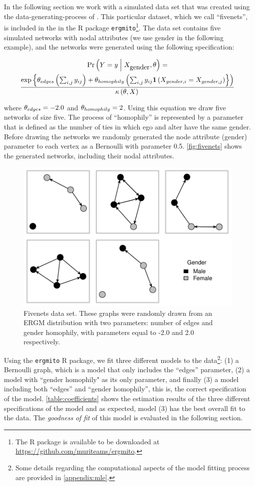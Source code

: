 \documentclass[12pt]{article}
\begin{document}
In the following section we work with a simulated data set that was created using the data-generating-process of \ergmitos{}. This particular dataset, which we call ``fivenets'', is included in the in the R package \texttt{ergmito}\footnote{The R package is available to be downloaded at  \url{https://github.com/muriteams/ergmito}.}. The data set contains five simulated networks with nodal attributes (we use gender in the following example), and the networks were generated using the following specification:

\begin{multline*}
\Prcond{\Adjmat = \adjmat}{\Indepvar_{\mbox{gender}}, \params} = \\
\frac{ %
    \exp{\params_{edges}\left(\sum_{i,j} \adjmat_{ij}\right) + %
    \params_{homophily}\left(\sum_{i,j} \adjmat_{ij}\isone{\Indepvar_{gender, i} = \Indepvar_{gender, j}}}\right) %
    }{%
    \normconst{}
    }
\end{multline*}

\noindent where $\theta_{edges} = -2.0$ and $\theta_{homophily} = 2$. Using this equation we draw five networks of size five. The process of ``homophily'' is represented by a parameter that is defined as the number of ties in which ego and alter have the same gender. Before drawing the networks we randomly generated the node attribute (gender) parameter to each vertex as a Bernoulli with parameter 0.5. \autoref{fig:fivenets} shows the generated networks, including their nodal attributes.

\begin{figure}[tb]
    \centering
    \includegraphics[width=.6\linewidth]{figures/fivenets_graphs.pdf}
    \caption{\label{fig:fivenets}Fivenets data set. These graphs were randomly drawn from an ERGM distribution with two parameters: number of edges and gender homophily, with parameters equal to -2.0 and 2.0 respectively.}
    \label{fig:my_label}
\end{figure}

Using the \texttt{ergmito} R package, we fit three different models to the data\footnote{Some details regarding the computational aspects of the model fitting process are provided in \ref{appendix:mle}.}: (1) a Bernoulli graph, which is a model that only includes the ``edges'' parameter, (2) a model with ``gender homophily" as its only parameter, and finally (3) a model including both ``edges'' and ``gender homophily'', this is, the correct specification of the model. \autoref{table:coefficients} shows the estimation results of the three different specifications of the model and as expected, model (3) has the best overall fit to the data. The \textit{goodness of fit} of this model is evaluated in the following section.
\end{document}

